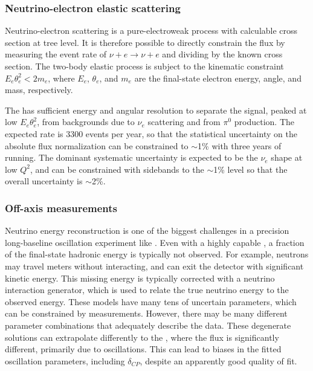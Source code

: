\subsubsection{Neutrino-electron elastic scattering}

Neutrino-electron scattering is a pure-electroweak process with calculable cross section at tree level. It is therefore possible to directly constrain the flux by measuring the event rate of $\nu+ e \rightarrow \nu +e$ and dividing by the known cross section. The two-body elastic process is subject to the kinematic constraint $E_{e}\theta_{e}^{2} < 2m_{e}$, where $E_{e}$, $\theta_{e}$, and $m_{e}$ are the final-state electron energy, angle, and mass, respectively.

The  has sufficient energy and angular resolution to separate the signal, peaked at low $E_{e}\theta_{e}^{2}$, from backgrounds due to $\nu_{e}$  scattering and from  $\pi^{0}$ production. The expected rate is \num{3300} events per year, so that the statistical uncertainty on the absolute flux normalization can be constrained to $\sim$1\% with three years of running. The dominant systematic uncertainty is expected to be the $\nu_{e}$  shape at low $Q^{2}$, and can be constrained with sidebands to the $\sim$1\% level so that the overall uncertainty is $\sim$2\%.

\subsubsection{Off-axis  measurements}
\label{sec:ch-nu-osc-06-ndconcept-offaxis}

Neutrino energy reconstruction is one of the biggest challenges in a precision long-baseline oscillation experiment like . Even with a highly capable , a fraction of the final-state hadronic energy is typically not observed. For example, neutrons may travel meters without interacting, and can exit the detector with significant kinetic energy. This missing energy is typically corrected with a neutrino interaction generator, which is used to relate the true neutrino energy to the observed energy. These models have many tens of uncertain parameters, which can be constrained by  measurements. However, there may be many different parameter combinations that adequately describe the  data. These degenerate solutions can extrapolate differently to the , where the flux is significantly different, primarily due to oscillations. This can lead to biases in the fitted oscillation parameters, including $\delta_{CP}$, despite an apparently good quality of fit.

